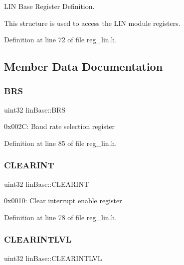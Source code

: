L\+IN Base Register Definition.

This structure is used to access the L\+IN module registers. 

Definition at line 72 of file reg\+\_\+lin.\+h.



\subsection{Member Data Documentation}
\mbox{\label{structlinBase_a88001d21796a358d8bec76c3e5e78bb4}} 
\subsubsection{\texorpdfstring{B\+RS}{BRS}}
{\footnotesize\ttfamily uint32 lin\+Base\+::\+B\+RS}

0x002C\+: Baud rate selection register 

Definition at line 85 of file reg\+\_\+lin.\+h.

\mbox{\label{structlinBase_a7b4cd525abb10f6a3c426bfc217b8b21}} 
\subsubsection{\texorpdfstring{C\+L\+E\+A\+R\+I\+NT}{CLEARINT}}
{\footnotesize\ttfamily uint32 lin\+Base\+::\+C\+L\+E\+A\+R\+I\+NT}

0x0010\+: Clear interrupt enable register 

Definition at line 78 of file reg\+\_\+lin.\+h.

\mbox{\label{structlinBase_ab06a9ea5f7853f5c0581da7e52c7daa9}} 
\subsubsection{\texorpdfstring{C\+L\+E\+A\+R\+I\+N\+T\+L\+VL}{CLEARINTLVL}}
{\footnotesize\ttfamily uint32 lin\+Base\+::\+C\+L\+E\+A\+R\+I\+N\+T\+L\+VL}

